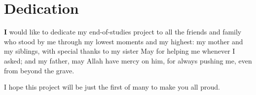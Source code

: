 \section*{Dedication}


\vspace{1cm}
\par \textbf{I} would like to dedicate my end-of-studies project to all the
friends and family who stood by me through my lowest moments and my highest:
my mother and my siblings, with special thanks to my sister May for helping me
whenever I asked; and my father, may Allah have mercy on him, for always pushing
me, even from beyond the grave.

I hope this project will be just the first of many to make you all proud.
